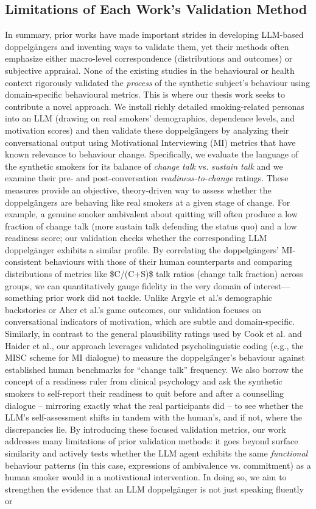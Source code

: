 \subsection{Limitations of Each Work's Validation Method}
In summary, prior works have made important strides in developing LLM-based doppelgängers and inventing ways to validate them, yet their methods often emphasize either macro-level correspondence (distributions and outcomes) or subjective appraisal. None of the existing studies in the behavioural or health context rigorously validated the \emph{process} of the synthetic subject’s behaviour using domain-specific behavioural metrics. This is where our thesis work seeks to contribute a novel approach. We install richly detailed smoking-related personas into an LLM (drawing on real smokers’ demographics, dependence levels, and motivation scores) and then validate these doppelgängers by analyzing their conversational output using Motivational Interviewing (MI) metrics that have known relevance to behaviour change. Specifically, we evaluate the language of the synthetic smokers for its balance of \textit{change talk} vs. \textit{sustain talk} and we examine their pre- and post-conversation \textit{readiness-to-change} ratings. These measures provide an objective, theory-driven way to assess whether the doppelgängers are behaving like real smokers at a given stage of change. For example, a genuine smoker ambivalent about quitting will often produce a low fraction of change talk (more sustain talk defending the status quo) and a low readiness score; our validation checks whether the corresponding LLM doppelgänger exhibits a similar profile. By correlating the doppelgängers’ MI-consistent behaviours with those of their human counterparts and comparing distributions of metrics like \$C/(C+S)\$ talk ratios (change talk fraction) across groups, we can quantitatively gauge fidelity in the very domain of interest---something prior work did not tackle. Unlike Argyle et al.’s demographic backstories or Aher et al.’s game outcomes, our validation focuses on conversational indicators of motivation, which are subtle and domain-specific. Similarly, in contrast to the general plausibility ratings used by Cook et al. and Haider et al., our approach leverages validated psycholinguistic coding (e.g., the MISC scheme for MI dialogue) to measure the doppelgänger’s behaviour against established human benchmarks for “change talk” frequency. We also borrow the concept of a readiness ruler from clinical psychology and ask the synthetic smokers to self-report their readiness to quit before and after a counselling dialogue – mirroring exactly what the real participants did – to see whether the LLM’s self-assessment shifts in tandem with the human’s, and if not, where the discrepancies lie. By introducing these focused validation metrics, our work addresses many limitations of prior validation methods: it goes beyond surface similarity and actively tests whether the LLM agent exhibits the same \emph{functional} behaviour patterns (in this case, expressions of ambivalence vs. commitment) as a human smoker would in a motivational intervention. In doing so, we aim to strengthen the evidence that an LLM doppelgänger is not just speaking fluently or 